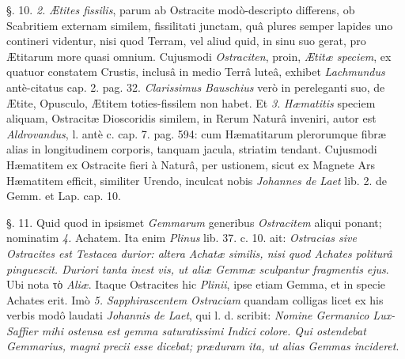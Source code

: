 \documentclass[a4paper, 11pt, oneside, polutonikogreek, german]{article}
\begin{document}
§. 10. \emph{2.} \emph{Ætites fissilis}, parum ab Ostracite modò-descripto differens, ob Scabritiem externam similem, fissilitati junctam, quâ plures semper lapides uno contineri videntur, nisi quod Terram, vel aliud quid, in sinu suo gerat, pro Ætitarum more quasi omnium. Cujusmodi \emph{Ostraciten}, proin, \emph{Ætitæ speciem}, ex quatuor constatem Crustis, inclusâ in medio Terrâ luteâ, exhibet \emph{Lachmundus} antè-citatus cap. 2. pag. 32. \emph{Clarissimus Bauschius} verò in pereleganti suo, de Ætite, Opusculo, Ætitem toties-fissilem non habet. Et \emph{3.} \emph{Hæmatitis} speciem aliquam, Ostracitæ Dioscoridis similem, in Rerum Naturâ inveniri, autor est \emph{Aldrovandus}, l. antè c. cap. 7. pag. 594: cum Hæmatitarum plerorumque fibræ alias in longitudinem corporis, tanquam jacula, striatim tendant. Cujusmodi Hæmatitem ex Ostracite fieri à Naturâ, per ustionem, sicut ex Magnete Ars Hæmatitem efficit, similiter Urendo, inculcat nobis \emph{Johannes de Laet} lib. 2. de Gemm. et Lap. cap. 10.

§. 11. Quid quod in ipsismet \emph{Gemmarum} generibus \emph{Ostracitem} aliqui ponant; nominatim \emph{4.} Achatem. Ita enim \emph{Plinus} lib. 37. c. 10. ait: \emph{Ostracias sive Ostracites est Testacea durior: altera Achatæ similis, nisi quod Achates politurâ pinguescit. Duriori tanta inest vis, ut aliæ Gemmæ sculpantur fragmentis ejus}. Ubi nota τὸ \emph{Aliæ}. Itaque Ostracites hic \emph{Plinii}, ipse etiam Gemma, et in specie Achates erit. Imò \emph{5.} \emph{Sapphirascentem Ostraciam} quandam colligas licet ex his verbis modô laudati \emph{Johannis de Laet}, qui l. d. scribit: \emph{Nomine Germanico Lux-Saffier mihi ostensa est gemma saturatissimi Indici colore. Qui ostendebat Gemmarius, magni precii esse dicebat; præduram ita, ut alias Gemmas incideret}.
\end{document}
